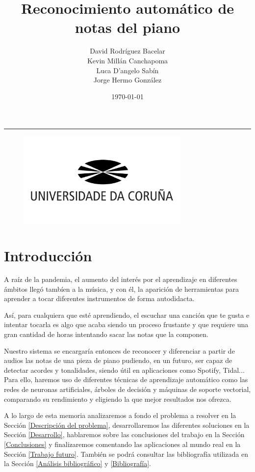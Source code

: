 \documentclass[12pt]{article}
\title{\textbf{\huge Reconocimiento automático de notas del piano}}
\author{{David Rodríguez Bacelar} \\[0.25cm] {Kevin Millán Canchapoma} \\[0.25cm]{Luca D'angelo Sabín} \\[0.25cm]{Jorge Hermo González}}
\date{\today}
\newcommand{\HRule}{\rule{\linewidth}{0.5mm}}
\begin{document}
\maketitle
\HRule
\bigskip\bigskip\bigskip\bigskip\bigskip\bigskip
\begin{figure}[h!]
	\centering
	\includegraphics[height=180px]{udc.jpg}
	\label{fig:diagram1}
\end{figure}

\newpage

\tableofcontents

\newpage
\section{Introducción}

A raíz de la pandemia, el aumento del interés por el aprendizaje en diferentes ámbitos llegó tambíen a la música, y con él, la aparición
de herramientas para aprender a tocar diferentes instrumentos de forma autodidacta.

\bigskip
Así, para cualquiera que esté aprendiendo, el escuchar una canción que te gusta e intentar tocarla es algo que acaba siendo un proceso
frustante y que requiere una gran cantidad de horas intentando sacar las notas que la componen.

\bigskip
Nuestro sistema se encargaría entonces de reconocer y diferenciar a partir de audios las notas de una pieza de piano
pudiendo, en un futuro, ser capaz de detectar acordes y tonalidades, siendo útil en aplicaciones como Spotify, Tidal... Para ello, haremos uso
de diferentes técnicas de aprendizaje automático como las redes de neuronas artificiales, árboles de decisión y máquinas de soporte vectorial,
comparando su rendimiento y eligiendo la que mejor resultados nos ofrezca.

\bigskip
A lo largo de esta memoria analizaremos a fondo el problema a resolver en la Sección \ref{Descripción del problema}, desarrollaremos las diferentes soluciones en la
Sección \ref{Desarrollo}, hablaremos sobre las conclusiones del trabajo en la Sección \ref{Conclusiones} y finalizaremos comentando las aplicaciones al mundo
real en la Sección \ref{Trabajo futuro}. También se podrá consultar las bibliografía utilizada en la Sección \ref{Análisis bibliográfico} y \ref{Bibliografía}.
\end{document}
